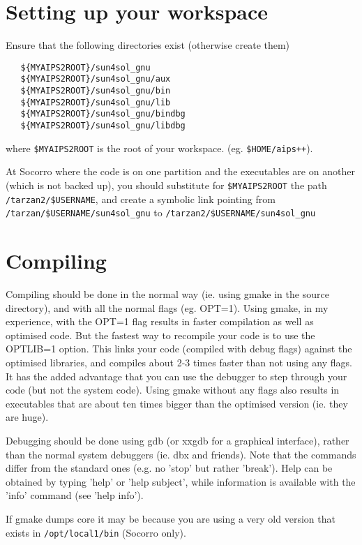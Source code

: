 \section{Setting up your workspace}

Ensure that the following directories exist (otherwise create them)
\begin{verbatim}
   ${MYAIPS2ROOT}/sun4sol_gnu
   ${MYAIPS2ROOT}/sun4sol_gnu/aux
   ${MYAIPS2ROOT}/sun4sol_gnu/bin
   ${MYAIPS2ROOT}/sun4sol_gnu/lib
   ${MYAIPS2ROOT}/sun4sol_gnu/bindbg
   ${MYAIPS2ROOT}/sun4sol_gnu/libdbg
\end{verbatim}
where \texttt{\${MYAIPS2ROOT}} is the root of your workspace. 
(eg. \texttt{\$HOME/aips++}). 

At Socorro where the code is on one partition and the executables are on
another (which is not backed up), you should substitute for
\texttt{\$MYAIPS2ROOT} the path \texttt{/tarzan2/\$USERNAME}, 
and create a symbolic link pointing from
\texttt{/tarzan/\$USERNAME/sun4sol\_gnu}  to
\texttt{/tarzan2/\$USERNAME/sun4sol\_gnu}
 
\section{Compiling}
Compiling should be done in the normal way (ie. using gmake in the source
directory), and with all the normal flags (eg. OPT=1). Using gmake, in my
experience, with the OPT=1 flag results in faster compilation as
well as optimised code. But the fastest way to recompile your code is to
use the OPTLIB=1 option. This links your code (compiled with debug flags)
against the optimised libraries, and compiles about 2-3 times faster than
not using any flags. It has the added advantage that you can use the
debugger to step through your code (but not the system code). Using gmake
without any flags also results in executables that are about ten times
bigger than the optimised version (ie. they are huge). 

Debugging should be done using gdb (or xxgdb for a graphical interface),
rather than the normal system debuggers (ie. dbx and friends). Note that the
commands differ from the standard ones (e.g. no 'stop' but rather 'break').
Help can be obtained by typing 'help' or 'help subject', while information
is available with the 'info' command (see 'help info').

If gmake dumps core it may be because you are using a very old
version that exists in \texttt{/opt/local1/bin} (Socorro only).
   
